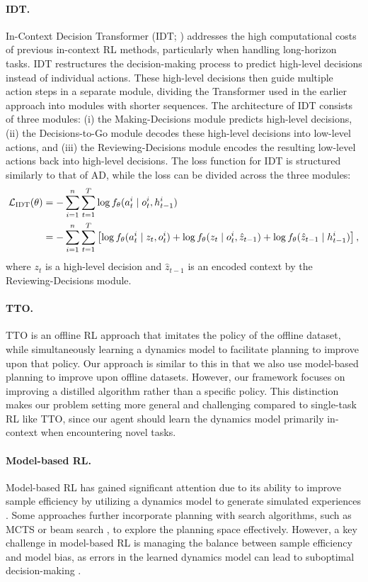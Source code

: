 \documentclass{article}
\begin{document}
\paragraph*{IDT.}
In-Context Decision Transformer (IDT; \citet{IDT}) addresses the high computational costs of previous in-context RL methods, particularly when handling long-horizon tasks.
IDT restructures the decision-making process to predict high-level decisions instead of individual actions.
These high-level decisions then guide multiple action steps in a separate module, dividing the Transformer used in the earlier approach \citep{AD} into modules with shorter sequences.
The architecture of IDT consists of three modules:
(i) the Making-Decisions module predicts high-level decisions,
(ii) the Decisions-to-Go module decodes these high-level decisions into low-level actions, and
(iii) the Reviewing-Decisions module encodes the resulting low-level actions back into high-level decisions.
The loss function for IDT is structured similarly to that of AD, while the loss can be divided across the three modules:
\begin{align}
    {\mathcal{L}}_{\textrm{IDT}}(\theta) &= - \sum_{i=1}^n \sum_{t=1}^{T} \log f_\theta (a_t^i \mid o_t^i, h_{t-1}^i) \nonumber \\
    &= - \sum_{i=1}^n \sum_{t=1}^{T} \left[
    \log f_\theta(a_t^i \mid z_t, o_t^i) +
    \log f_\theta(z_t \mid o_t^i, \hat{z}_{t-1}) +
    \log f_\theta(\hat{z}_{t-1} \mid h_{t-1}^i) \right],
    \label{eq:idt}
\end{align}
where $z_t$ is a high-level decision and $\hat{z}_{t-1}$ is an encoded context by the Reviewing-Decisions module.

\paragraph*{TTO.}
TTO \citep{TTO} is an offline RL approach that imitates the policy of the offline dataset, while simultaneously learning a dynamics model to facilitate planning to improve upon that policy.
Our approach is similar to this in that we also use model-based planning to improve upon offline datasets.
However, our framework focuses on improving a distilled algorithm rather than a specific policy.
This distinction makes our problem setting more general and challenging compared to single-task RL like TTO, since our agent should learn the dynamics model primarily in-context when encountering novel tasks.

\paragraph*{Model-based RL.}
Model-based RL has gained significant attention due to its ability to improve sample efficiency by utilizing a dynamics model to generate simulated experiences \citep{WM, SimPLe, MBPO, MuZero, EfficientZero, DreamerV3}.
Some approaches further incorporate planning with search algorithms, such as MCTS \citep{MuZero,Reanalyse,EfficientZero} or beam search \citep{TTO}, to explore the planning space effectively.
However, a key challenge in model-based RL is managing the balance between sample efficiency and model bias, as errors in the learned dynamics model can lead to suboptimal decision-making \citep{MBPO}.
\end{document}
